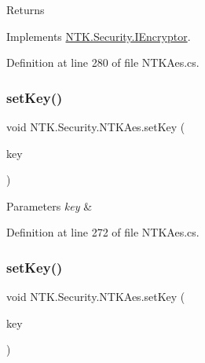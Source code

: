 \begin{DoxyReturn}{Returns}

\end{DoxyReturn}


Implements \mbox{\hyperlink{interface_n_t_k_1_1_security_1_1_i_encryptor_a8e93c4114dd5cb6510465381a7fe3228}{N\+T\+K.\+Security.\+I\+Encryptor}}.



Definition at line 280 of file N\+T\+K\+Aes.\+cs.

\mbox{\label{class_n_t_k_1_1_security_1_1_n_t_k_aes_a19733b3d2a0c97fdc2a8a86767954cfc}} 
\subsubsection{\texorpdfstring{setKey()}{setKey()}\hspace{0.1cm}{\footnotesize\ttfamily [1/2]}}
{\footnotesize\ttfamily void N\+T\+K.\+Security.\+N\+T\+K\+Aes.\+set\+Key (\begin{DoxyParamCaption}\item[{\mbox{\hyperlink{struct_n_t_k_1_1_security_1_1_aes_key}{Aes\+Key}}}]{key }\end{DoxyParamCaption})}






\begin{DoxyParams}{Parameters}
{\em key} & \\
\hline
\end{DoxyParams}


Definition at line 272 of file N\+T\+K\+Aes.\+cs.

\mbox{\label{class_n_t_k_1_1_security_1_1_n_t_k_aes_aca17757ef38bf30e088c1b2a2d4f4478}} 
\subsubsection{\texorpdfstring{setKey()}{setKey()}\hspace{0.1cm}{\footnotesize\ttfamily [2/2]}}
{\footnotesize\ttfamily void N\+T\+K.\+Security.\+N\+T\+K\+Aes.\+set\+Key (\begin{DoxyParamCaption}\item[{string}]{key }\end{DoxyParamCaption})}







